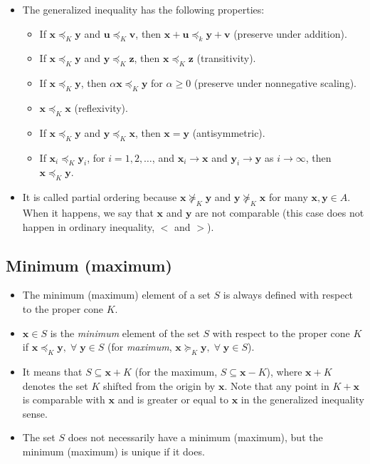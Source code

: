 \documentclass{article}
\begin{document}
\begin{itemize}
	\item The generalized inequality has the following properties:
	      \begin{itemize}[label={$\triangleright$}]
		      \item If \(\mathbf{x} \preceq_K \mathbf{y}\) and \(\mathbf{u} \preceq_K \mathbf{v}\), then \(\mathbf{x} + \mathbf{u} \preceq_k \mathbf{y} + \mathbf{v}\) (preserve under addition).
		      \item If \(\mathbf{x} \preceq_K \mathbf{y}\) and \(\mathbf{y} \preceq_K \mathbf{z}\), then \(\mathbf{x} \preceq_K \mathbf{z}\) (transitivity).
		      \item If \(\mathbf{x}\preceq_K \mathbf{y}\), then \(\alpha\mathbf{x}\preceq_K \mathbf{y}\) for \(\alpha\geq0\) (preserve under nonnegative scaling).
		      \item \(\mathbf{x}\preceq_K \mathbf{x}\) (reflexivity).
		      \item If \(\mathbf{x}\preceq_K \mathbf{y}\) and \(\mathbf{y}\preceq_K \mathbf{x}\), then \(\mathbf{x} = \mathbf{y}\) (antisymmetric).
		      \item If \(\mathbf{x}_i\preceq_K \mathbf{y}_i\), for \(i = 1, 2, \dots\), and \(\mathbf{x}_i \rightarrow \mathbf{x}\) and \(\mathbf{y}_i \rightarrow \mathbf{y}\) as \(i \rightarrow \infty\), then \(\mathbf{x} \preceq_K \mathbf{y}\).
	      \end{itemize}
	\item It is called partial ordering because \(\mathbf{x} \nsucceq_K \mathbf{y}\) and \(\mathbf{y} \nsucceq_K \mathbf{x}\) for many \(\mathbf{x}, \mathbf{y} \in A\). When it happens, we say that \(\mathbf{x}\) and \(\mathbf{y}\) are not comparable (this case does not happen in ordinary inequality, \(<\) and \(>\)).
\end{itemize}
\subsection{Minimum (maximum)}
\begin{itemize}
	\item The minimum (maximum) element of a set \(S\) is always defined with respect to the proper cone \(K\).
	\item \(\mathbf{x} \in S\) is the \emph{minimum} element of the set \(S\) with respect to the proper cone \(K\) if \(\mathbf{x} \preceq_K \mathbf{y}, \;\forall\;\mathbf{y} \in S\) (for \emph{maximum}, \(\mathbf{x} \succeq_K \mathbf{y}, \;\forall\;\mathbf{y} \in S\)).
	\item It means that \(S \subseteq \mathbf{x} + K\) (for the maximum, \(S \subseteq \mathbf{x} - K\)), where \(\mathbf{x} + K\) denotes the set \(K\) shifted from the origin by \(\mathbf{x}\). Note that any point in \(K+\mathbf{x}\) is comparable with \(\mathbf{x}\) and is greater or equal to \(\mathbf{x}\) in the generalized inequality sense.
	\item The set \(S\) does not necessarily have a minimum (maximum), but the minimum (maximum) is unique if it does.
\end{itemize}
\end{document}
